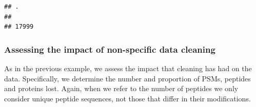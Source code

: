 \documentclass[9pt,a4paper,]{extarticle}
\begin{document}
\begin{verbatim}
## .
##       
## 17999
\end{verbatim}

\hypertarget{assessing-the-impact-of-non-specific-data-cleaning-1}{%
\subsubsection{Assessing the impact of non-specific data cleaning}\label{assessing-the-impact-of-non-specific-data-cleaning-1}}

As in the previous example, we assess the impact that cleaning has had on the
data. Specifically, we determine the number and proportion of PSMs, peptides and
proteins lost. Again, when we refer to the number of peptides we only consider
unique peptide sequences, not those that differ in their modifications.
\end{document}
